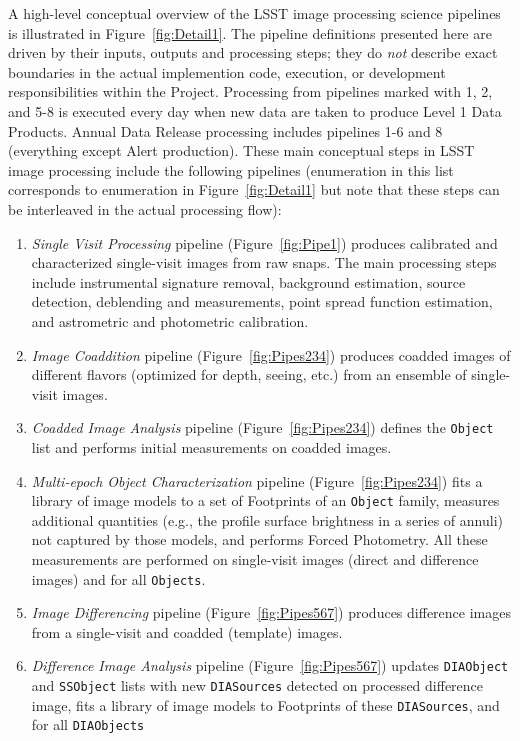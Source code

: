 \documentclass[12pt]{article}
\newcommand{\code}[1]{\texttt{#1}}
\newcommand{\DIASources}{\code{DIASources}\xspace}
\newcommand{\DIAObject}{\code{DIAObject}\xspace}
\newcommand{\DIAObjects}{\code{DIAObjects}\xspace}
\newcommand{\Object}{\code{Object}\xspace}
\newcommand{\Objects}{\code{Objects}\xspace}
\newcommand{\SSObject}{\code{SSObject}\xspace}
\begin{document}
A high-level conceptual overview of the LSST image processing science pipelines is illustrated
in Figure~\ref{fig:Detail1}. The pipeline definitions presented here are driven by their inputs,
outputs and processing steps; they do {\it not} describe exact boundaries in the actual implemention
code, execution, or development responsibilities within the Project.
Processing from pipelines marked with 1, 2, and 5-8 is executed every day when new data are taken
to produce Level 1 Data Products. Annual Data Release processing includes pipelines 1-6 and 8
(everything except Alert production). These main conceptual steps in LSST image processing
include the following pipelines (enumeration in this list corresponds to enumeration in Figure~\ref{fig:Detail1}
but note that these steps can be interleaved in the actual processing flow):
\begin{enumerate}
\item {\it Single Visit Processing} pipeline (Figure~\ref{fig:Pipe1}) produces calibrated and
characterized single-visit images from raw snaps. The main processing steps include instrumental
signature removal, background estimation, source detection, deblending and measurements,
point spread function estimation, and astrometric and photometric calibration.
\item {\it Image Coaddition} pipeline (Figure~\ref{fig:Pipes234}) produces coadded images
of different flavors (optimized for depth, seeing, etc.) from an ensemble of single-visit images.
\item {\it Coadded Image Analysis} pipeline (Figure~\ref{fig:Pipes234}) defines the \Object list
and performs initial measurements on coadded images.
\item {\it Multi-epoch Object Characterization} pipeline (Figure~\ref{fig:Pipes234}) fits a library
of image models to a set of Footprints of an \Object family, measures additional quantities (e.g.,
the profile surface brightness in a series of annuli) not captured by those models, and performs
Forced Photometry. All these measurements are performed on single-visit images (direct and
difference images) and for all \Objects.
\item {\it Image Differencing} pipeline (Figure~\ref{fig:Pipes567}) produces difference images
from a single-visit and coadded (template) images.
\item {\it Difference Image Analysis} pipeline (Figure~\ref{fig:Pipes567}) updates
\DIAObject and \SSObject lists with new \DIASources detected on processed difference image,
fits a library of image models to Footprints of these \DIASources, and for all \DIAObjects

\end{enumerate}
\end{document}
